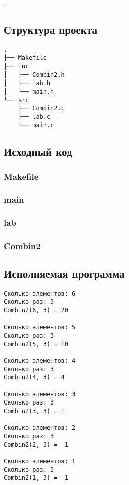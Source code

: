 \documentclass[12pt, a4paper]{article}
\begin{document}
.

\subsection{Структура проекта}

\begin{verbatim}
.
├── Makefile
├── inc
│   ├── Combin2.h
│   ├── lab.h
│   └── main.h
└── src
    ├── Combin2.c
    ├── lab.c
    └── main.c
\end{verbatim}

\subsection{Исходный код}

\subsubsection{Makefile}


\subsubsection{main}



\subsubsection{lab}



\subsubsection{Combin2}



\subsection{Исполняемая программа}

\begin{verbatim}
Сколько элементов: 6
Сколько раз: 3    
Combin2(6, 3) = 20

Сколько элементов: 5
Сколько раз: 3
Combin2(5, 3) = 10

Сколько элементов: 4
Сколько раз: 3
Combin2(4, 3) = 4

Сколько элементов: 3
Сколько раз: 3
Combin2(3, 3) = 1

Сколько элементов: 2
Сколько раз: 3
Combin2(2, 3) = -1

Сколько элементов: 1
Сколько раз: 3
Combin2(1, 3) = -1
\end{verbatim}

\labconclusion{}
\end{document}
